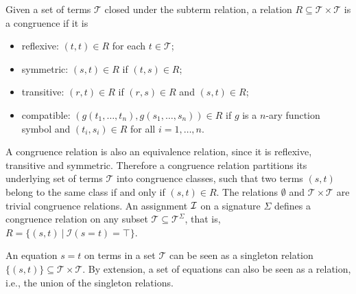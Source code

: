 \documentclass[smallextended]{svjour3}
\begin{document}
%
%
\begin{definition}  Given a set of terms $\mathcal{T}$ closed under the subterm relation, a relation $R \subseteq \mathcal{T} \times \mathcal{T}$ is a congruence if it is
\begin{itemize}
\item reflexive: $(t,t) \in R$ for each $t \in \mathcal{T}$;
\item symmetric: $(s,t) \in R$ if $(t,s) \in R$;
\item transitive:  $(r,t) \in R$ if $(r,s) \in R$ and $(s,t) \in R$;
\item compatible: $(g(t_1,\ldots,t_n),g(s_1,\ldots,s_n)) \in R$ if  $g$ is a $n$-ary function symbol and $(t_i,s_i) \in R$  for all $i = 1,\ldots,n$.
\end{itemize}

\end{definition}
\noindent A congruence relation is also an equivalence relation, since it is
reflexive, transitive and symmetric.  Therefore a congruence relation partitions
its underlying set of terms $\mathcal{T}$ into congruence classes, such that two
terms $(s,t)$ belong to the same class if and only if $(s,t) \in R$.  The
relations $\emptyset$ and $\mathcal{T} \times \mathcal{T}$ are trivial
congruence relations.  An assignment $\cal I$ on a signature $\Sigma$ defines a congruence relation on any subset $\mathcal{T}\subseteq\mathcal{T}^\Sigma$, that is, $R = \{(s,t) \ |\ \mathcal{I}(s = t) = \top \}$.

An equation $s = t$ on terms in a set $\mathcal{T}$ can be seen as a singleton relation $\{(s,t)\} \subseteq \mathcal{T} \times \mathcal{T}$.  By extension, a set of equations can also be seen as a relation, i.e., the union of the singleton relations.  
\end{document}
